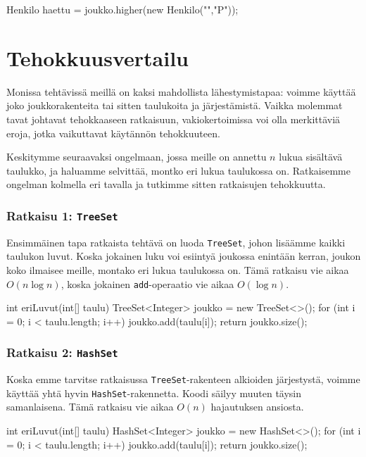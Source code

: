 \begin{code}
Henkilo haettu = joukko.higher(new Henkilo("","P"));
\end{code}

\section{Tehokkuusvertailu}

Monissa tehtävissä meillä on kaksi mahdollista lähestymistapaa:
voimme käyttää joko joukkorakenteita tai sitten taulukoita ja järjestämistä.
Vaikka molemmat tavat johtavat tehokkaaseen ratkaisuun,
vakiokertoimissa voi olla merkittäviä eroja, jotka vaikuttavat
käytännön tehokkuuteen.

Keskitymme seuraavaksi ongelmaan, jossa meille on annettu
$n$ lukua sisältävä taulukko, ja haluamme selvittää,
montko eri lukua taulukossa on.
Ratkaisemme ongelman kolmella eri tavalla ja tutkimme sitten
ratkaisujen tehokkuutta.

\subsubsection{Ratkaisu 1: \texttt{TreeSet}}

Ensimmäinen tapa ratkaista tehtävä on luoda \texttt{TreeSet},
johon lisäämme kaikki taulukon luvut.
Koska jokainen luku voi esiintyä joukossa enintään kerran,
joukon koko ilmaisee meille, montako eri lukua taulukossa on.
Tämä ratkaisu vie aikaa $O(n \log n)$, koska jokainen
\texttt{add}-operaatio vie aikaa $O(\log n)$.

\begin{code}
int eriLuvut(int[] taulu) {
    TreeSet<Integer> joukko = new TreeSet<>();
    for (int i = 0; i < taulu.length; i++) {
        joukko.add(taulu[i]);
    }
    return joukko.size();
}
\end{code}

\subsubsection{Ratkaisu 2: \texttt{HashSet}}

Koska emme tarvitse ratkaisussa \texttt{TreeSet}-rakenteen
alkioiden järjestystä, voimme käyttää
yhtä hyvin \texttt{HashSet}-rakennetta.
Koodi säilyy muuten täysin samanlaisena.
Tämä ratkaisu vie aikaa $O(n)$ hajautuksen ansiosta.

\begin{code}
int eriLuvut(int[] taulu) {
    HashSet<Integer> joukko = new HashSet<>();
    for (int i = 0; i < taulu.length; i++) {
        joukko.add(taulu[i]);
    }
    return joukko.size();
}
\end{code}

